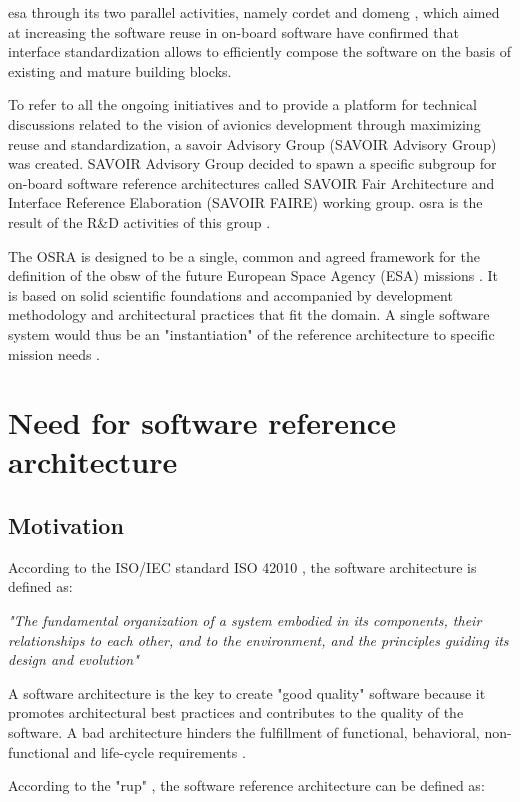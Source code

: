 \ac{esa} through its two parallel activities, namely \ac{cordet} and \ac{domeng} \cite{CORDET}, which aimed at increasing the software reuse in on-board software have confirmed that interface standardization allows to efficiently compose the software on the basis of existing and mature building blocks.

To refer to all the ongoing initiatives and to provide a platform for technical discussions related to the vision of avionics development through maximizing reuse and standardization, a \ac{savoir} Advisory Group (SAVOIR Advisory Group) was created. SAVOIR Advisory Group decided to spawn a specific subgroup for on-board software reference architectures called SAVOIR Fair Architecture and Interface Reference Elaboration (SAVOIR FAIRE) working group. \ac{osra} is the result of the R\&D activities of this group \cite{SAVOIR}.   

The OSRA is designed to be a single, common and agreed framework for the definition of the \ac{obsw} of the future European Space Agency (ESA) missions \cite{SAVOIR}. It is based on solid scientific foundations and accompanied by development methodology and architectural practices that fit the domain. A single software system would thus be an "instantiation" of the reference architecture to specific mission needs \cite{PhdThesis}\cite{SAVOIR}.

\section{Need for software reference architecture}
\subsection{Motivation}
According to the ISO/IEC standard ISO 42010 \cite{ISO42010}, the software architecture is defined as: 

\textit{"The fundamental organization of a system embodied in its components, their relationships
to each other, and to the environment, and the principles guiding its design and evolution"}
 
A software architecture is the key to create "good quality" software because it promotes architectural best practices and contributes to the quality of the software. A bad architecture hinders the fulfillment of functional, behavioral, non-functional and life-cycle requirements \cite{PhdThesis}.

According to the "\ac{rup}" \cite{RUP}, the software reference architecture can be defined as:

